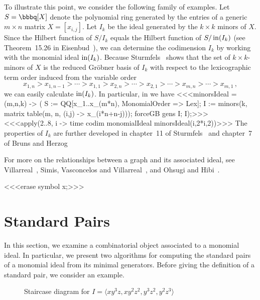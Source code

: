 To illustrate this point, we consider the following family of
examples.  Let $S = \bbbq[X]$ denote the polynomial ring generated by
the entries of a generic $m \times n$ matrix $X = [x_{i,j}]$.  Let
$I_{k}$ be the ideal generated by the $k \times
k$ minors of $X$.  Since the Hilbert function of $S / I_{k}$ equals
the Hilbert function of $S / \operatorname{in}(I_{k})$ (see Theorem~15.26 in
Eisenbud~\cite{MR97a:13001}), we can determine the codimension $I_{k}$
by working with the monomial ideal $\operatorname{in}(I_{k})$.  Because
Sturmfels~\cite{MR91m:14076} shows that the set of $k \times k$-minors
of $X$ is the reduced Gr\"{o}bner basis of $I_{k}$ with respect to the
lexicographic term order induced from the variable order
\[
x_{1,n} > x_{1,n-1} > \dotsb > x_{1,1} > x_{2,n} > \dotsb > x_{2,1} >
\dotsb > x_{m,n} > \dotsb > x_{m,1} \, ,
\] 
we can easily calculate $\operatorname{in}(I_k)$.  In particular, in \Mtwo we
have
<<<minorsIdeal = (m,n,k) -> (
     S := QQ[x_1..x_(m*n), MonomialOrder => Lex];
     I := minors(k, matrix table(m, n, (i,j) -> x_(i*n+n-j)));
     forceGB gens I;
     I);>>>
<<<apply(2..8, i -> time codim monomialIdeal minorsIdeal(i,2*i,2))>>>
The properties of $I_{k}$ are further developed in chapter~11 of
Sturmfels~\cite{MR97b:13034} and chapter~7 of Bruns and
Herzog~\cite{MR95h:13020}

For more on the relationships between a graph and its associated
ideal, see Villarreal~\cite{MR91b:13031}, Simis, Vasconcelos and
Villarreal~\cite{MR99c:13004}, and Ohsugi and
Hibi~\cite{MR2000a:13010}.

<<<erase symbol x;>>>

\section{Standard Pairs}

In this section, we examine a combinatorial object associated to a
monomial ideal.  In particular, we present two algorithms for
computing the standard pairs of a monomial ideal from its minimal
generators.  Before giving the definition of a standard pair, we
consider an example.

\begin{figure} 
\begin{center}
\epsfysize=2.4in 
\end{center}
\caption{Staircase diagram for $I = \langle xy^3z, xy^2z^2, y^3z^2,
y^2z^3 \rangle$}
\end{figure}


